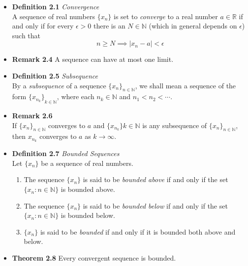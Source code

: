 \documentclass[11pt,a4paper]{article}
\begin{document}
\begin{itemize}
    \item \textbf{Definition 2.1} \emph{Convergence} \\
        A sequence of real numbers $\{ x_n \}$ is set to \emph{converge} to a real number
        $a \in \mathbb{R}$ if and only if for every $\epsilon > 0$ there is an
        $N \in \mathbb{N}$ (which in general depends on $\epsilon$) such that
        \[
            n \geq N \implies |x_n - a| < \epsilon
        \]

    \item \textbf{Remark 2.4}
        A sequence can have at most one limit.

    \item \textbf{Definition 2.5} \emph{Subsequence} \\
        By a \emph{subsequence} of a sequence ${\{x_n\}}_{n \in \mathbb{N}}$,
        we shall mean a sequence of the form ${\{x_n_k\}}_{k \in \mathbb{N}}$,
        where each $n_k \in \mathbb{N}$ and $n_1 < n_2 < \cdots$.

    \item \textbf{Remark 2.6} \\
        If ${ \{x_n\} }_{n \in \mathbb{N}}$ converges to $a$ and
        ${ \{x_n_k\} }{k \in \mathbb{N}}$ is any subsequence of
        ${ \{x_n\} }_{n \in \mathbb{N}}$, then $x_n_k$ converges to $a$ as $k \to \infty$.

    \item \textbf{Definition 2.7} \emph{Bounded Sequences} \\
        Let $\{ x_n \}$ be a sequence of real numbers.
        \begin{enumerate}
            \item The sequence $\{ x_n \}$ is said to be \emph{bounded above} if and only if
                the set $ \{ x_n : n \in \mathbb{N} \}$ is bounded above.
            \item The sequence $\{ x_n \}$ is said to be \emph{bounded below} if and only if
                the set $\{ x_n : n \in \mathbb{N} \}$ is bounded below.
            \item $\{ x_n \}$ is said to be \emph{bounded} if and only if it is bounded both
                above and below.
        \end{enumerate}

    \item \textbf{Theorem 2.8}
        Every convergent sequence is bounded.
\end{itemize}
\end{document}
